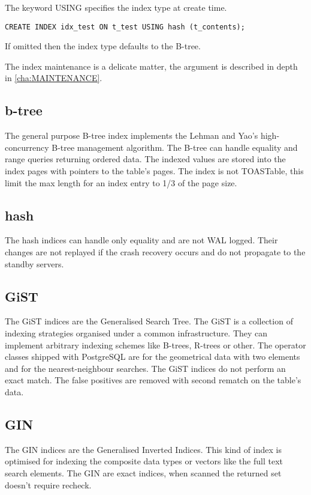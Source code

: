 The keyword USING specifies the index type at create time.
\begin{lstlisting}[style=pgsql]
 CREATE INDEX idx_test ON t_test USING hash (t_contents);
\end{lstlisting}

If omitted then the index type defaults to the B-tree.

The index maintenance is a delicate matter, the argument is described in depth
in \ref{cha:MAINTENANCE}.


\subsection{b-tree}
The general purpose B-tree index implements the Lehman and Yao's
high-concurrency B-tree management algorithm. The B-tree can handle equality and range queries 
returning ordered data. The indexed values are stored into the index pages with pointers to the
table's pages. The index is not TOASTable, this limit the max length for an index entry to 1/3 of
the page size. \newline

\subsection{hash}
The hash indices can handle only equality and are not WAL logged. Their changes
are not replayed if the crash recovery occurs and do not propagate to the standby servers.\newline

\subsection{GiST}
The GiST indices are the Generalised Search Tree. The GiST is a collection of
indexing strategies organised under a common infrastructure. They can implement arbitrary indexing
schemes like B-trees, R-trees  or other. The operator classes shipped with PostgreSQL are for the
geometrical data with two elements and for the nearest-neighbour searches. The GiST indices do not
perform an exact match. The false positives are removed with second rematch on the
table's data.\newline

\subsection{GIN}
The GIN indices  are the Generalised Inverted Indices. This kind of index
is optimised for indexing the composite data types or vectors like the full text search elements.
The GIN are exact indices, when scanned the returned set doesn't require recheck.



